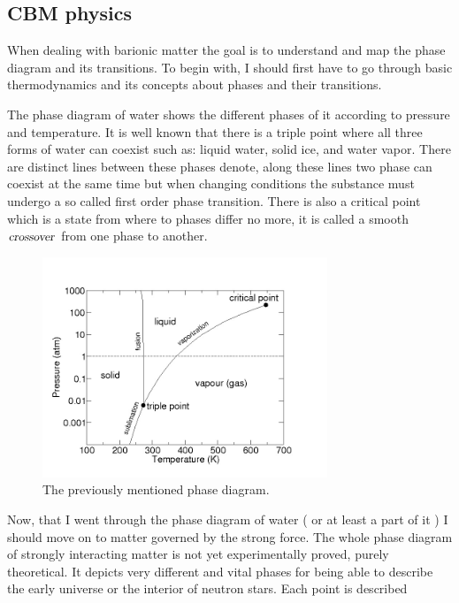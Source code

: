\documentclass[a4paper,12pt]{article}
\begin{document}
\subsection{ CBM physics }
\vspace{5mm}
\par When dealing with barionic matter the goal is to understand and map the phase diagram and its transitions. To begin
 with, I should first have to go through basic thermodynamics and its concepts about phases and their transitions.
\vspace{5mm}
\par The phase diagram of water shows the different phases of it according to pressure and temperature. It is well known that
 there is a triple point where all three forms of water can coexist such as: liquid water,  solid ice, and water vapor. There 
 are distinct lines between these phases denote, along these lines two phase can coexist at the same time but when changing conditions
   the substance must undergo a so called first order phase transition. There is also a critical point which is a state from where to
    phases differ no more, it is called a smooth $\textsl{crossover}$ from one phase to another.
\begin{figure}[H]
\centering
\includegraphics[width=0.76\textwidth]{water_phase.jpg}
\caption{ The previously mentioned phase diagram. }
\end{figure}
\par Now, that I went through the phase diagram of water ( or at least a part of it ) I should move on to matter governed by the 
strong force. The whole phase diagram of strongly interacting matter is not yet experimentally proved, purely theoretical. It depicts
 very different and vital phases for being able to describe the early universe or the interior of neutron stars. Each point is described
\end{document}
